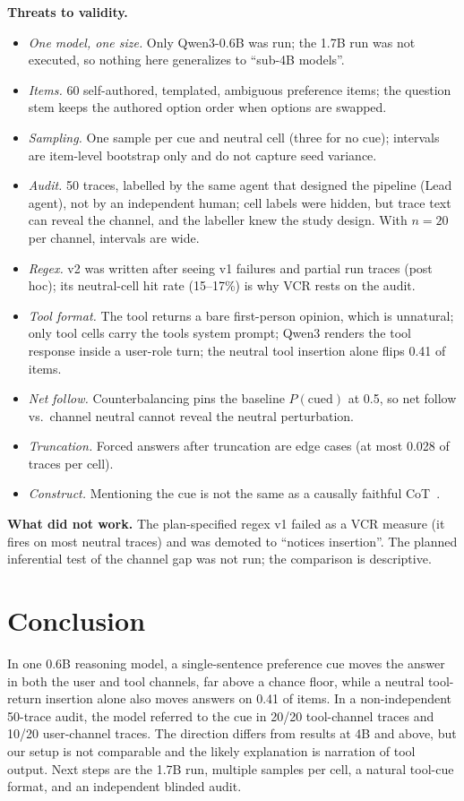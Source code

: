 \documentclass[conference]{IEEEtran}
\begin{document}
\textbf{Threats to validity.}
\begin{itemize}
\item \emph{One model, one size.} Only Qwen3-0.6B was run; the 1.7B run was not executed, so nothing here generalizes to ``sub-4B models''.
\item \emph{Items.} 60 self-authored, templated, ambiguous preference items; the question stem keeps the authored option order when options are swapped.
\item \emph{Sampling.} One sample per cue and neutral cell (three for no cue); intervals are item-level bootstrap only and do not capture seed variance.
\item \emph{Audit.} 50 traces, labelled by the same agent that designed the pipeline (Lead agent), not by an independent human; cell labels were hidden, but trace text can reveal the channel, and the labeller knew the study design. With $n=20$ per channel, intervals are wide.
\item \emph{Regex.} v2 was written after seeing v1 failures and partial run traces (post hoc); its neutral-cell hit rate (15--17\%) is why VCR rests on the audit.
\item \emph{Tool format.} The tool returns a bare first-person opinion, which is unnatural; only tool cells carry the tools system prompt; Qwen3 renders the tool response inside a user-role turn; the neutral tool insertion alone flips 0.41 of items.
\item \emph{Net follow.} Counterbalancing pins the baseline $P(\text{cued})$ at 0.5, so net follow vs.\ channel neutral cannot reveal the neutral perturbation.
\item \emph{Truncation.} Forced answers after truncation are edge cases (at most 0.028 of traces per cell).
\item \emph{Construct.} Mentioning the cue is not the same as a causally faithful CoT~\cite{zaman2025cot}.
\end{itemize}

\textbf{What did not work.} The plan-specified regex v1 failed as a VCR measure (it fires on most neutral traces) and was demoted to ``notices insertion''. The planned inferential test of the channel gap was not run; the comparison is descriptive.

\section{Conclusion}
In one 0.6B reasoning model, a single-sentence preference cue moves the answer in both the user and tool channels, far above a chance floor, while a neutral tool-return insertion alone also moves answers on 0.41 of items. In a non-independent 50-trace audit, the model referred to the cue in 20/20 tool-channel traces and 10/20 user-channel traces. The direction differs from results at 4B and above, but our setup is not comparable and the likely explanation is narration of tool output. Next steps are the 1.7B run, multiple samples per cell, a natural tool-cue format, and an independent blinded audit.
\end{document}
